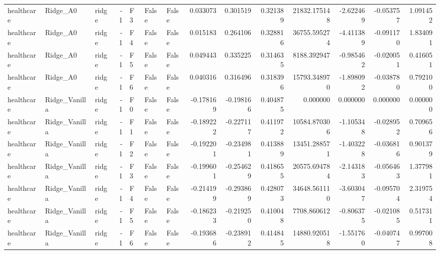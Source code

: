 \begin{tabular}{lllrlllrrrrrrr}
healthcare &       Ridge\_A0 &     ridge &    -1 &  F3 &           False &            False &  0.033073 &  0.301519 & 0.321389 &     21832.175148 &          -2.622469 &       -0.053757 &            1.091452 \\
healthcare &       Ridge\_A0 &     ridge &    -1 &  F4 &           False &            False &  0.015183 &  0.264106 & 0.328816 &     36755.595274 &          -4.411389 &       -0.091170 &            1.834091 \\
healthcare &       Ridge\_A0 &     ridge &    -1 &  F5 &           False &            False &  0.049443 &  0.335225 & 0.314635 &      8188.392947 &          -0.985462 &       -0.020051 &            0.416051 \\
healthcare &       Ridge\_A0 &     ridge &    -1 &  F6 &           False &            False &  0.040316 &  0.316496 & 0.318396 &     15793.348970 &          -1.898092 &       -0.038780 &            0.792100 \\
healthcare &  Ridge\_Vanilla &     ridge &    -1 &  F0 &           False &            False & -0.178169 & -0.198166 & 0.404875 &         0.000000 &           0.000000 &        0.000000 &            0.000000 \\
healthcare &  Ridge\_Vanilla &     ridge &    -1 &  F1 &           False &            False & -0.189222 & -0.227117 & 0.411972 &     10584.870306 &          -1.105348 &       -0.028952 &            0.709656 \\
healthcare &  Ridge\_Vanilla &     ridge &    -1 &  F2 &           False &            False & -0.192201 & -0.234981 & 0.413889 &     13451.288571 &          -1.403228 &       -0.036816 &            0.901379 \\
healthcare &  Ridge\_Vanilla &     ridge &    -1 &  F3 &           False &            False & -0.199601 & -0.254629 & 0.418655 &     20575.694784 &          -2.143183 &       -0.056463 &            1.377981 \\
healthcare &  Ridge\_Vanilla &     ridge &    -1 &  F4 &           False &            False & -0.214199 & -0.293869 & 0.428073 &     34648.561110 &          -3.603047 &       -0.095704 &            2.319754 \\
healthcare &  Ridge\_Vanilla &     ridge &    -1 &  F5 &           False &            False & -0.186233 & -0.219250 & 0.410048 &      7708.860612 &          -0.806375 &       -0.021085 &            0.517311 \\
healthcare &  Ridge\_Vanilla &     ridge &    -1 &  F6 &           False &            False & -0.193686 & -0.238912 & 0.414845 &     14880.920518 &          -1.551760 &       -0.040747 &            0.997008 \\

\end{tabular}
